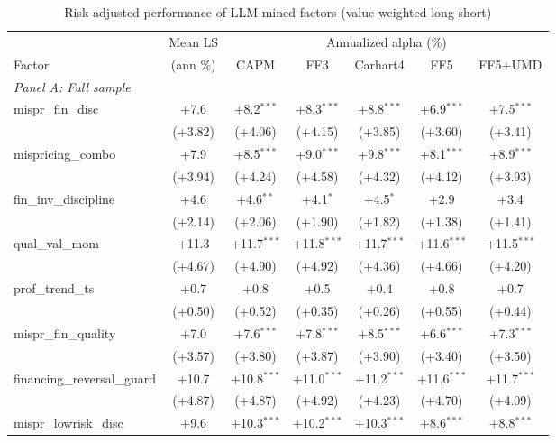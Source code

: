 \begin{table}[htbp]\centering
\caption{Risk-adjusted performance of LLM-mined factors (value-weighted long-short)}
\label{tab:alphas_vw}
\begin{threeparttable}\footnotesize
\begin{tabular}{lcccccc}
\toprule
 & Mean LS & \multicolumn{5}{c}{Annualized alpha (\%)} \\
\cmidrule(lr){3-7}
Factor & (ann \%) & CAPM & FF3 & Carhart4 & FF5 & FF5+UMD \\
\midrule
\multicolumn{7}{l}{\textit{Panel A: Full sample}} \\
\addlinespace
mispr\_fin\_disc & +7.6 & +8.2$^{***}$ & +8.3$^{***}$ & +8.8$^{***}$ & +6.9$^{***}$ & +7.5$^{***}$ \\
 & (+3.82) & (+4.06) & (+4.15) & (+3.85) & (+3.60) & (+3.41) \\
\addlinespace
mispricing\_combo & +7.9 & +8.5$^{***}$ & +9.0$^{***}$ & +9.8$^{***}$ & +8.1$^{***}$ & +8.9$^{***}$ \\
 & (+3.94) & (+4.24) & (+4.58) & (+4.32) & (+4.12) & (+3.93) \\
\addlinespace
fin\_inv\_discipline & +4.6 & +4.6$^{**}$ & +4.1$^{*}$ & +4.5$^{*}$ & +2.9 & +3.4 \\
 & (+2.14) & (+2.06) & (+1.90) & (+1.82) & (+1.38) & (+1.41) \\
\addlinespace
qual\_val\_mom & +11.3 & +11.7$^{***}$ & +11.8$^{***}$ & +11.7$^{***}$ & +11.6$^{***}$ & +11.5$^{***}$ \\
 & (+4.67) & (+4.90) & (+4.92) & (+4.36) & (+4.66) & (+4.20) \\
\addlinespace
prof\_trend\_ts & +0.7 & +0.8 & +0.5 & +0.4 & +0.8 & +0.7 \\
 & (+0.50) & (+0.52) & (+0.35) & (+0.26) & (+0.55) & (+0.44) \\
\addlinespace
mispr\_fin\_quality & +7.0 & +7.6$^{***}$ & +7.8$^{***}$ & +8.5$^{***}$ & +6.6$^{***}$ & +7.3$^{***}$ \\
 & (+3.57) & (+3.80) & (+3.87) & (+3.90) & (+3.40) & (+3.50) \\
\addlinespace
financing\_reversal\_guard & +10.7 & +10.8$^{***}$ & +11.0$^{***}$ & +11.2$^{***}$ & +11.6$^{***}$ & +11.7$^{***}$ \\
 & (+4.87) & (+4.87) & (+4.92) & (+4.23) & (+4.70) & (+4.09) \\
\addlinespace
mispr\_lowrisk\_disc & +9.6 & +10.3$^{***}$ & +10.2$^{***}$ & +10.3$^{***}$ & +8.6$^{***}$ & +8.8$^{***}$ \\

\end{tabular}
\end{threeparttable}
\end{table}
